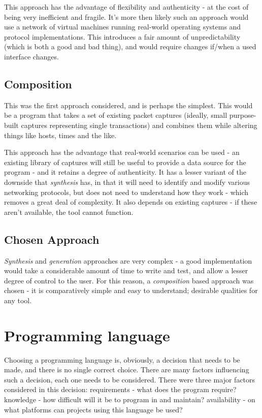 \documentclass[10pt,a4paper,notitlepage]{report}
\begin{document}
This approach has the advantage of flexibility and authenticity - at the cost of being very inefficient and fragile. It's more then likely such an approach would use a network of virtual machines running real-world operating systems and protocol implementations. This introduces a fair amount of unpredictability (which is both a good and bad thing), and would require changes if/when a used interface changes.

\subsection{Composition}
This was the first approach considered, and is perhaps the simplest. This would be a program that takes a set of existing packet captures (ideally, small purpose-built captures representing single transactions) and combines them while altering things like hosts, times and the like.

This approach has the advantage that real-world scenarios can be used - an existing library of captures will still be useful to provide a data source for the program - and it retains a degree of authenticity. It has a lesser variant of the downside that \emph{synthesis} has, in that it will need to identify and modify various networking protocols, but does not need to understand how they work - which removes a great deal of complexity. It also depends on existing captures - if these aren't available, the tool cannot function.

\subsection{Chosen Approach}
\emph{Synthesis} and \emph{generation} approaches are very complex - a good implementation would take a considerable amount of time to write and test, and allow a lesser degree of control to the user. For this reason, a \emph{composition} based approach was chosen - it is comparatively simple and easy to understand; desirable qualities for any tool.

\section{Programming language}
Choosing a programming language is, obviously, a decision that needs to be made, and there is no single correct choice. There are many factors influencing such a decision, each one needs to be considered. There were three major factors considered in this decision: requirements - what does the program require? knowledge - how difficult will it be to program in and maintain? availability - on what platforms can projects using this language be used?
\end{document}
